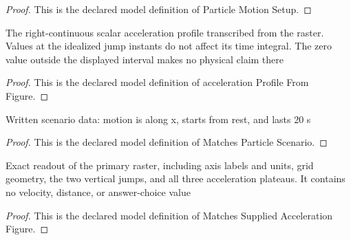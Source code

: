 \begin{proof}
  This is the declared model definition of Particle Motion Setup.
\end{proof}
\begin{definition}
  \label{def:physics:phyx-mini-0670:phyxminiproblems-problemphyxmini0670-accelerationprofilefromfigure}
  The right-continuous scalar acceleration profile transcribed from the raster. Values at the idealized jump instants do not affect its time integral. The zero value outside the displayed interval makes no physical claim there
\end{definition}
\begin{proof}
  This is the declared model definition of acceleration Profile From Figure.
\end{proof}
\begin{definition}
  \label{def:physics:phyx-mini-0670:phyxminiproblems-problemphyxmini0670-matchesparticlescenario}
  Written scenario data: motion is along x, starts from rest, and lasts 20 s
\end{definition}
\begin{proof}
  This is the declared model definition of Matches Particle Scenario.
\end{proof}
\begin{definition}
  \label{def:physics:phyx-mini-0670:phyxminiproblems-problemphyxmini0670-matchessuppliedaccelerationfigure}
  Exact readout of the primary raster, including axis labels and units, grid geometry, the two vertical jumps, and all three acceleration plateaus. It contains no velocity, distance, or answer-choice value
\end{definition}
\begin{proof}
  This is the declared model definition of Matches Supplied Acceleration Figure.
\end{proof}
